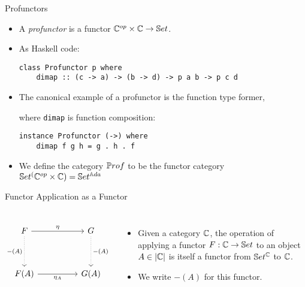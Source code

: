 \begin{frame}[fragile]{Profunctors}
	\begin{itemize}
		\item A \textit{profunctor} is a functor $\mathbb{C}^{op} \times \mathbb{C} \to \mathbb{S}et$.
		\pause\item As Haskell code:
		\begin{lstlisting}
class Profunctor p where
	dimap :: (c -> a) -> (b -> d) -> p a b -> p c d
		\end{lstlisting}
		\pause\item The canonical example of a profunctor is the function type former, 
		
		where \texttt{dimap} is function composition:
		\begin{lstlisting}
instance Profunctor (->) where
	dimap f g h = g . h . f
		\end{lstlisting}
		\pause\item We define the category ${\mathbb{P}rof}$ to be the functor category $\mathbb{S}et^(\mathbb{C}^{op} \times \mathbb{C}) = \mathbb{S}et^{\mathbb{A}da}$
	\end{itemize}
\end{frame}
\begin{frame}[fragile]{Functor Application as a Functor}
	\begin{columns}
		\[\begin{tikzcd}
			F && G \\
			\\
			{F(A)} && {G(A)}
			\arrow["{\eta}", from=1-1, to=1-3]
			\arrow["{-(A)}"', dotted, from=1-1, to=3-1]
			\arrow["{-(A)}", dotted, from=1-3, to=3-3]
			\arrow["{\eta_A}"', from=3-1, to=3-3]
		\end{tikzcd}\]
		\begin{itemize}
			\item Given a category $\mathbb{C}$, the operation of applying a functor $F : \mathbb{C} \to \mathbb{S}et$ to an object $A \in |\mathbb{C}|$ is itself a functor from $\mathbb{S}et^{\mathbb{C}}$ to $\mathbb{C}$.
			\pause\item We write $-(A)$ for this functor.
		\end{itemize}
	\end{columns}
\end{frame}
